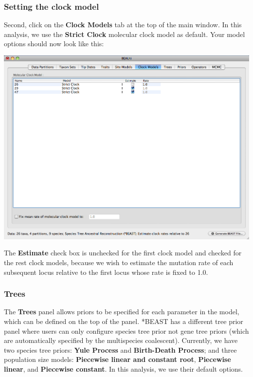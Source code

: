 \documentclass[12pt]{article}
\begin{document}
\medskip{}

\subsubsection*{Setting the clock model}

Second, click on the {\bf Clock Models} tab at the top of the
main window. In this analysis, we use the \textbf{Strict Clock} molecular clock model as default.
Your model options should now look like this: 

\medskip{}

\includegraphics[scale=0.4]{figures/BEAUti_Clock}

\medskip{}

The \textbf{Estimate} check box is unchecked for the first clock model and checked for the rest clock models, because we wish to estimate the mutation rate of each subsequent locus relative to the first locus whose rate is fixed to 1.0. 

\subsubsection*{Trees}

The {\bf Trees} panel allows priors to be specified for each parameter in the model, which can be defined on the top of the panel. *BEAST has a different tree prior panel where users can only configure species tree prior not gene tree priors (which are automatically specified by the multispecies coalescent). Currently, we have two species tree priors: \textbf{Yule Process} and \textbf{Birth-Death Process}; and three population size models: \textbf{Piecewise linear and constant root}, \textbf{Piecewise linear}, and \textbf{Piecewise constant}. In this analysis, we use their default options.
\end{document}
